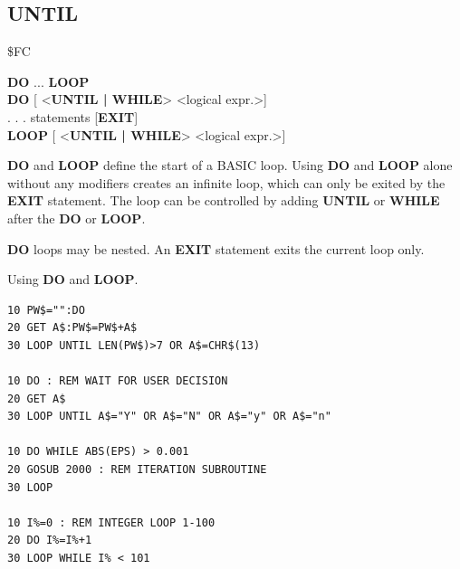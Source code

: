 \subsection{UNTIL}
\begin{description}[leftmargin=2cm,style=nextline]
\item [Token:] \$FC
\item [Format:] {\bf DO} ... {\bf LOOP} \\
                {\bf DO} [ <{\bf UNTIL | WHILE}> <logical expr.>] \\
                . . . statements [{\bf EXIT}] \\
                {\bf LOOP} [ <{\bf UNTIL | WHILE}> <logical expr.>]
\item [Usage:] {\bf DO} and {\bf LOOP} define
                the start of a BASIC loop.
                Using {\bf DO} and {\bf LOOP} alone without any
                modifiers creates an infinite loop, which can only be exited
                by the {\bf EXIT} statement. The loop can be
                controlled by adding {\bf UNTIL} or {\bf WHILE}
                after the {\bf DO} or {\bf LOOP}.

\item [Remarks:] {\bf DO} loops may be nested. An {\bf EXIT} statement
               exits the current loop only.
\item [Examples:] Using {\bf DO} and {\bf LOOP}.
\begin{tcolorbox}[colback=black,coltext=white]
\verbatimfont{\codefont}
\begin{verbatim}
10 PW$="":DO
20 GET A$:PW$=PW$+A$
30 LOOP UNTIL LEN(PW$)>7 OR A$=CHR$(13)

10 DO : REM WAIT FOR USER DECISION
20 GET A$
30 LOOP UNTIL A$="Y" OR A$="N" OR A$="y" OR A$="n"

10 DO WHILE ABS(EPS) > 0.001
20 GOSUB 2000 : REM ITERATION SUBROUTINE
30 LOOP

10 I%=0 : REM INTEGER LOOP 1-100
20 DO I%=I%+1
30 LOOP WHILE I% < 101
\end{verbatim}
\end{tcolorbox}
\end{description}


\newpage
